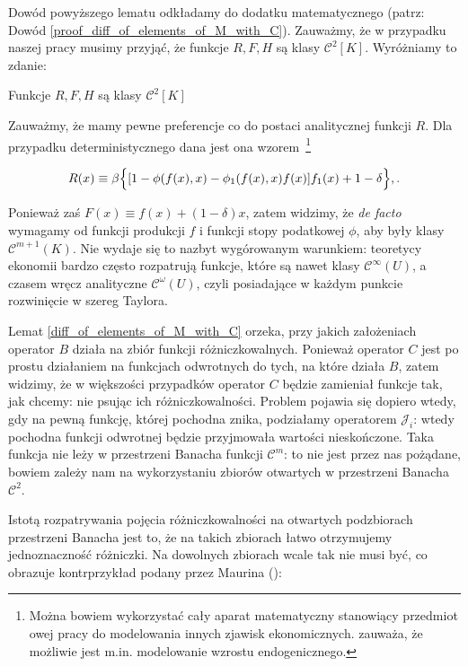 Dowód powyższego lematu odkładamy do dodatku matematycznego (patrz: Dowód \ref{proof_diff_of_elements_of_M_with_C}). Zauważmy, że w przypadku naszej pracy musimy przyjąć, że funkcje $R,F,H$ są klasy $\mathcal{C}^{2}[K]$. Wyróżniamy to zdanie:

\begin{ass}\label{needed_diff}
Funkcje $R,F,H$ są klasy $\mathcal{C}^{2}[K]$
\end{ass}

	Zauważmy, że mamy pewne preferencje co do postaci analitycznej funkcji $R$. Dla przypadku deterministycznego dana jest ona wzorem~\footnote{Można bowiem wykorzystać cały aparat matematyczny stanowiący przedmiot owej pracy do modelowania innych zjawisk ekonomicznych. \citet{Coleman2} zauważa, że możliwie jest m.in. modelowanie wzrostu endogenicznego.}
	
\begin{equation*}
	R(x) \equiv \beta \Bigl \{[1 - \phi(f(x),x) - \phi_1 (f(x),x)f(x)]f_1 (x) + 1 - \delta \Bigl \},.
\end{equation*}	
	 
Ponieważ zaś $F(x) \equiv f(x) + (1 - \delta)x $, zatem widzimy, że {\it de facto} wymagamy od funkcji produkcji $f$ i funkcji stopy podatkowej $\phi$, aby były klasy $\mathcal{C}^{m+1}(K)$. Nie wydaje się to nazbyt wygórowanym warunkiem: teoretycy ekonomii bardzo często rozpatrują funkcje, które są nawet klasy $\mathcal{C}^{\infty}(U)$, a czasem wręcz analityczne $\mathcal{C}^{\omega}(U)$, czyli posiadające w każdym punkcie rozwinięcie w szereg Taylora.

	Lemat \ref{diff_of_elements_of_M_with_C} orzeka, przy jakich założeniach operator $B$ działa na zbiór funkcji różniczkowalnych. Ponieważ operator $C$ jest po prostu działaniem na funkcjach odwrotnych do tych, na które działa $B$, zatem widzimy, że w większości przypadków operator $C$ będzie zamieniał funkcje tak, jak chcemy: nie psując ich różniczkowalności. Problem pojawia się dopiero wtedy, gdy na pewną funkcję, której pochodna znika, podziałamy operatorem $\mathcal{J}_i$: wtedy pochodna funkcji odwrotnej będzie przyjmowała wartości nieskończone. Taka funkcja nie leży w przestrzeni Banacha funkcji $\mathcal{C}^m$: to nie jest przez nas pożądane, bowiem zależy nam na wykorzystaniu zbiorów otwartych w przestrzeni Banacha $\mathcal{C}^2$.

	Istotą rozpatrywania pojęcia różniczkowalności na otwartych podzbiorach przestrzeni Banacha jest to, że na takich zbiorach łatwo otrzymujemy jednoznaczność różniczki. Na dowolnych zbiorach wcale tak nie musi być, co obrazuje kontrprzykład podany przez Maurina (\citeyear[][S. 13, str. 200]{Maurin}):

